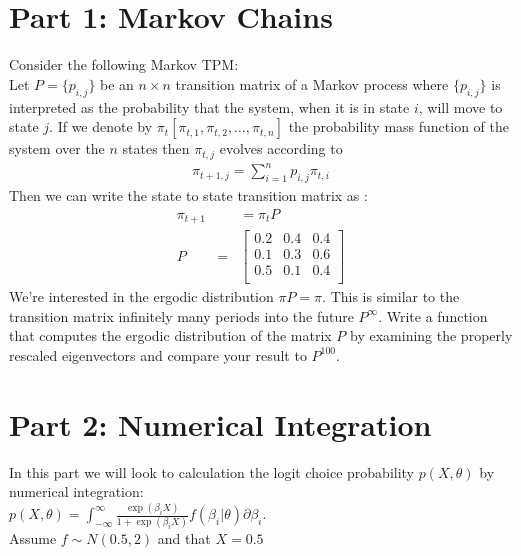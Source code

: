 \documentclass{article}
\begin{document}
\section*{Part 1: Markov Chains}
Consider the following Markov TPM:\\
Let $P = \{p_{i,j} \}$ be an $n \times n$ transition matrix of a Markov process where $\{p_{i,j} \}$ is interpreted as the probability that the system, when it is in state $i$, will move to state $j$. If we denote by $\pi_t [ \pi_{t,1} , \pi_{t,2}, \ldots, \pi_{t,n}]$ the probability mass function of the system over the $n$ states then $\pi_{t,j}$ evolves according to 
\begin{eqnarray*}
\pi_{t+1,j} = \sum_{i=1}^n p_{i,j} \pi_{t,i}
\end{eqnarray*}
Then we can write the state to state transition matrix as :
\begin{eqnarray*}
\pi_{t+1}& &= \pi_t P \\
P &=&
\left[ {\begin{array}{ccc}
    0.2&    0.4&    0.4\\
    0.1&    0.3&    0.6\\
    0.5&    0.1&    0.4\\
 \end{array} } \right]
\end{eqnarray*}
We're interested in the ergodic distribution $\pi P = \pi$. This is similar to the transition matrix infinitely many periods into the future $P^{\infty}$. Write a function that computes the ergodic distribution of the matrix $P$ by examining the properly rescaled eigenvectors and compare your result to $P^{100}$.
\section*{Part 2: Numerical Integration}
In this part we will look to calculation the logit choice probability $p(X,\theta)$ by numerical integration:\\
 $p(X,\theta) =\int_{-\infty}^{\infty} \frac{\exp(\beta_i X)}{1+ \exp(\beta_i X)} f(\beta_i | \theta) \partial \beta_i$. \\
 Assume $f \sim N(0.5,2)$ and that $X = 0.5$
 
\end{document}
